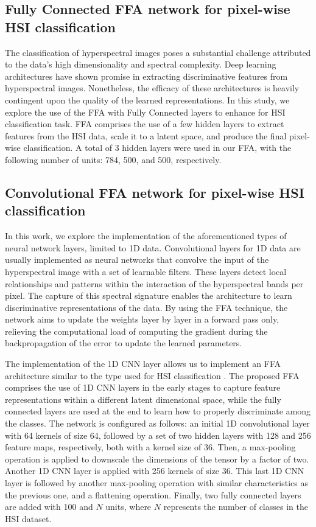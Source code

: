 \documentclass{article}
\begin{document}
\subsection{Fully Connected FFA network for pixel-wise HSI classification}
The classification of hyperspectral images poses a substantial challenge attributed to the data's high dimensionality and spectral complexity. Deep learning architectures have shown promise in extracting discriminative features from hyperspectral images. Nonetheless, the efficacy of these architectures is heavily contingent upon the quality of the learned representations. In this study, we explore the use of the FFA with Fully Connected layers to enhance for HSI classification task. FFA comprises the use of a few hidden layers to extract features from the HSI data, scale it to a latent space, and produce the final pixel-wise classification. A total of 3 hidden layers were used in our FFA, with the following number of units: 784, 500, and 500, respectively.

\subsection{Convolutional FFA network for pixel-wise HSI classification}
In this work, we explore the implementation of the aforementioned types of neural network layers, limited to 1D data. Convolutional layers for 1D data are usually implemented as neural networks that convolve the input of the hyperspectral image with a set of learnable filters. These layers detect local relationships and patterns within the interaction of the hyperspectral bands per pixel. The capture of this spectral signature enables the architecture to learn discriminative representations of the data. By using the FFA technique, the network aims to update the weights layer by layer in a forward pass only, relieving the computational load of computing the gradient during the backpropagation of the error to update the learned parameters.

The implementation of the 1D CNN layer allows us to implement an FFA architecture similar to the type used for HSI classification \cite{hu2015deep}. The proposed FFA comprises the use of 1D CNN layers in the early stages to capture feature representations within a different latent dimensional space, while the fully connected layers are used at the end to learn how to properly discriminate among the classes. The network is configured as follows: an initial 1D convolutional layer with 64 kernels of size 64, followed by a set of two hidden layers with 128 and 256 feature maps, respectively, both with a kernel size of 36. Then, a max-pooling operation is applied to downscale the dimensions of the tensor by a factor of two. Another 1D CNN layer is applied with 256 kernels of size 36. This last 1D CNN layer is followed by another max-pooling operation with similar characteristics as the previous one, and a flattening operation. Finally, two fully connected layers are added with 100 and $\textit{N}$ units, where $\textit{N}$ represents the number of classes in the HSI dataset.
\end{document}
